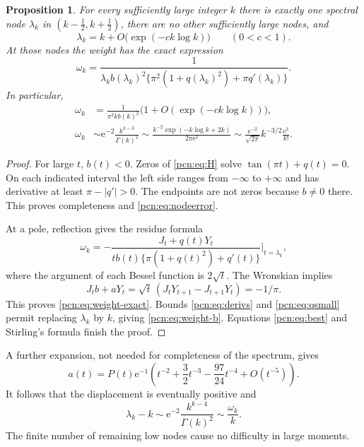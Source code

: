 \documentclass[11pt,letterpaper]{article}
\newtheorem{proposition}[theorem]{Proposition}
\theoremstyle{remark}\newtheorem{remark}[theorem]{Remark}
\newcommand{\ee}{\mathrm e}
\begin{document}
\begin{proposition}\label{pcn:prop:nodes}
For every sufficiently large integer $k$ there is exactly one spectral node $\lambda_k$ in $(k-\tfrac12,k+\tfrac12)$, there are no other sufficiently large nodes, and
\begin{equation}\label{pcn:eq:nodeerror}
 \lambda_k=k+O\bigl(\exp(-ck\log k)\bigr)\qquad(0<c<1).
\end{equation}
At those nodes the weight has the exact expression
\begin{equation}\label{pcn:eq:weight-exact}
 \omega_k=\frac1{\lambda_kb(\lambda_k)^2
     \{\pi^2(1+q(\lambda_k)^2)+\pi q'(\lambda_k)\}}.
\end{equation}
In particular,
\begin{align}
 \omega_k&=\frac1{\pi^2k b(k)^2}
       \bigl(1+O(\exp(-ck\log k))\bigr),\label{pcn:eq:weight-b}\\
 \omega_k&\sim\ee^{-2}\frac{k^{k-3}}{\Gamma(k)^2}
     \sim\frac{k^{-2}\exp(-k\log k+2k)}{2\pi\ee^2}
     \sim\frac{\ee^{-2}}{\sqrt{2\pi}}k^{-3/2}\frac{\ee^k}{k!}.
 \label{pcn:eq:weight-leading}
\end{align}
\end{proposition}
\begin{proof}
For large $t$, $b(t)<0$. Zeros of \eqref{pcn:eq:H} solve $\tan(\pi t)+q(t)=0$. On each indicated interval the left side ranges from $-\infty$ to $+\infty$ and has derivative at least $\pi-|q'|>0$. The endpoints are not zeros because $b\ne0$ there. This proves completeness and \eqref{pcn:eq:nodeerror}.

At a pole, reflection gives the residue formula
\[
 \omega_k=-\frac{J_t+q(t)Y_t}
 {t b(t)\{\pi(1+q(t)^2)+q'(t)\}}\bigg|_{t=\lambda_k},
\]
where the argument of each Bessel function is $2\sqrt t$. The Wronskian \cite[10.5.2]{DLMF} implies
\[
 J_tb+aY_t=\sqrt t\,(J_tY_{t+1}-J_{t+1}Y_t)=-1/\pi.
\]
This proves \eqref{pcn:eq:weight-exact}. Bounds \eqref{pcn:eq:derivs} and \eqref{pcn:eq:qsmall} permit replacing $\lambda_k$ by $k$, giving \eqref{pcn:eq:weight-b}. Equations \eqref{pcn:eq:best} and Stirling's formula finish the proof.
\end{proof}

A further expansion, not needed for completeness of the spectrum, gives
\[
 a(t)=P(t)\ee^{-1}\left(t^{-2}+\frac32t^{-3}-\frac{97}{24}t^{-4}
                               +O(t^{-5})\right).
\]
It follows that the displacement is eventually positive and
\begin{equation}\label{pcn:eq:shift}
 \lambda_k-k\sim\ee^{-2}\frac{k^{k-4}}{\Gamma(k)^2}\sim\frac{\omega_k}{k}.
\end{equation}
The finite number of remaining low nodes cause no difficulty in large moments.
\end{document}
